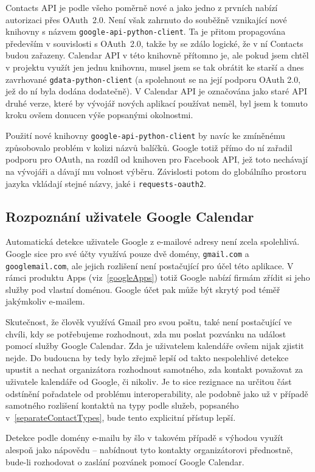 \documentclass[12pt,oneside,final]{fithesis2}
\begin{document}
Contacts API je podle všeho poměrně nové a jako jedno z prvních nabízí autorizaci přes OAuth~2.0. Není však zahrnuto do souběžně vznikající nové knihovny s názvem {\tt google-api-python-client}. Ta je přitom propagována především v souvislosti s OAuth~2.0, takže by se zdálo logické, že v ní Contacts budou zařazeny. Calendar API v této knihovně přítomno je, ale pokud jsem chtěl v projektu využít jen jednu knihovnu, musel jsem se tak obrátit ke starší a dnes zavrhované {\tt gdata-python-client} (a spolehnout se na její podporu OAuth 2.0, jež do ní byla dodána dodatečně). V Calendar API je označována jako staré API druhé verze, které by vývojář nových aplikací používat neměl, byl jsem k tomuto kroku ovšem donucen výše popsanými okolnostmi.

Použití nové knihovny {\tt google-api-python-client} by navíc ke zmíněnému způsobovalo problém v kolizi názvů balíčků. Google totiž přímo do ní zařadil podporu pro OAuth, na rozdíl od knihoven pro Facebook API, jež toto nechávají na vývojáři a dávají mu volnost výběru. Závislosti potom do globálního prostoru jazyka vkládají stejné názvy, jaké i {\tt requests-oauth2}.

\subsection{Rozpoznání uživatele Google Calendar}
Automatická detekce uživatele Google z e-mailové adresy není zcela spolehlivá. Google sice pro své účty využívá pouze dvě domény, {\tt gmail.com} a {\tt googlemail.com}, ale jejich rozlišení není postačující pro účel této aplikace. V rámci produktu Apps (viz~\ref{googleApps}) totiž Google nabízí firmám zřídit si jeho služby pod vlastní doménou. Google účet pak může být skrytý pod téměř jakýmkoliv e-mailem.

Skutečnost, že člověk využívá Gmail pro svou poštu, také není postačující ve chvíli, kdy se potřebujeme rozhodnout, zda mu poslat pozvánku na událost pomocí služby Google Calendar. Zda je uživatelem kalendáře ovšem nijak zjistit nejde. Do budoucna by tedy bylo zřejmě lepší od takto nespolehlivé detekce upustit a nechat organizátora rozhodnout samotného, zda kontakt považovat za uživatele kalendáře od Google, či nikoliv. Je to sice rezignace na určitou část odstínění pořadatele od problému interoperability, ale podobně jako už v případě samotného rozlišení kontaktů na typy podle služeb, popsaného v~\ref{separateContactTypes}, bude tento explicitní přístup lepší.

Detekce podle domény e-mailu by šlo v takovém případě s výhodou využít alespoň jako nápovědu -- nabídnout tyto kontakty organizátorovi přednostně, bude-li rozhodovat o zaslání pozvánek pomocí Google Calendar.
\end{document}
